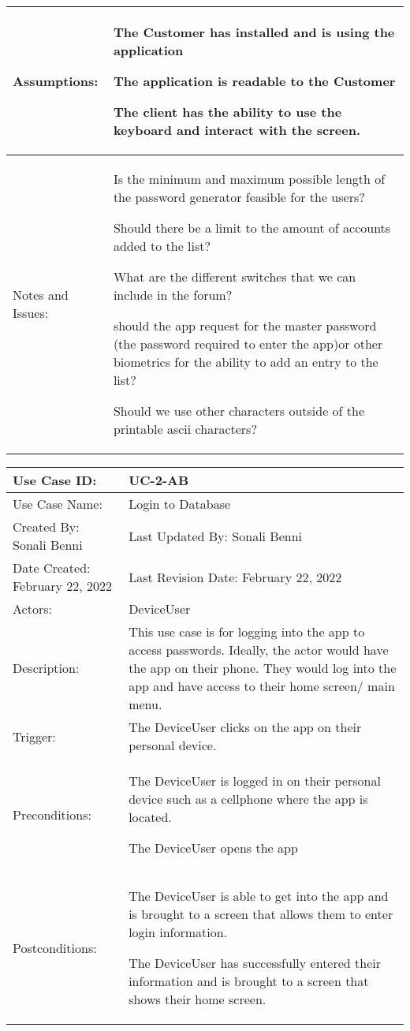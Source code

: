 \documentclass[stu]{apa7}
\newcommand{\nextitem}{\par\hspace*{\labelsep}\textbullet\hspace*{\labelsep}}
\begin{document}
{\begin{xltabular}{\textwidth}{|l|X|}
   Assumptions: & \nextitem The Customer has installed and is using the application
     \nextitem The application is readable to the Customer
     \nextitem The client has the ability to use the keyboard and interact with the screen. \\ \hline

   Notes and Issues: & \nextitem Is the minimum and maximum possible length of the password generator feasible for the users?
     \nextitem Should there be a limit to the amount of accounts added to the list?
     \nextitem What are the different switches that we can include in the forum?
     \nextitem should the app request for the master password (the password required to enter the app)or other biometrics for the ability to add an entry to the list?
     \nextitem Should we use other characters outside of the printable ascii characters? \\ \hline
\end{xltabular}



\scriptsize{\begin{xltabular}{\textwidth}{|l|X|}
  \hline Use Case ID: & UC-2-AB \\ \hline

  Use Case Name: & Login to Database \\ \hline

  Created By: Sonali Benni & Last Updated By: Sonali Benni \\ \hline

  Date Created: February 22, 2022 & Last Revision Date: February 22, 2022 \\ \hline

  Actors: & \nextitem DeviceUser \\ \hline
  
  Description: & This use case is for logging into the app to access passwords. Ideally, the actor would have the app on their phone. They would log into the app and have access to their home screen/ main menu. \\ \hline

  Trigger: & The DeviceUser clicks on the app on their personal device. \\ \hline

  Preconditions: & \nextitem The DeviceUser is logged in on their personal device such as a cellphone where the app is located. \nextitem The DeviceUser opens the app \\ \hline

  Postconditions: & \nextitem The DeviceUser is able to get into the app and is brought to a screen that allows them to enter login information.
    \nextitem The DeviceUser has successfully entered their information and is brought to a screen that shows their home screen.  \\ \hline


\end{xltabular}}}
\end{document}

